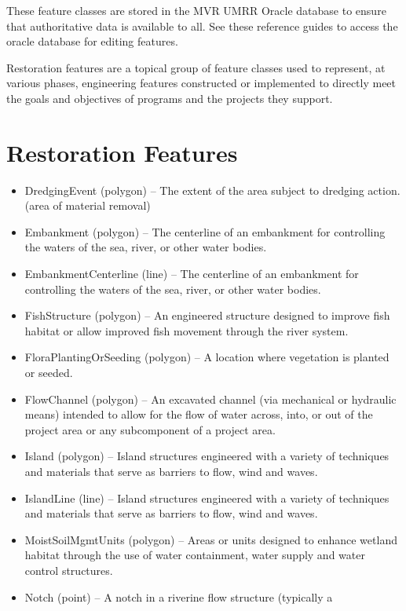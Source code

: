 \documentclass[
  letterpaper,
  DIV=11,
  numbers=noendperiod]{scrreprt}
\providecommand{\tightlist}{%
  \setlength{\itemsep}{0pt}\setlength{\parskip}{0pt}}
\begin{document}
These feature classes are stored in the MVR UMRR Oracle database to
ensure that authoritative data is available to all. See these reference
guides to access the oracle database for editing features.

Restoration features are a topical group of feature classes used to
represent, at various phases, engineering features constructed or
implemented to directly meet the goals and objectives of programs and
the projects they support.

\section{Restoration Features}\label{restoration-features-2}

\begin{itemize}
\tightlist
\item
  DredgingEvent (polygon) -- The extent of the area subject to dredging
  action. (area of material removal)
\item
  Embankment (polygon) -- The centerline of an embankment for
  controlling the waters of the sea, river, or other water bodies.
\item
  EmbankmentCenterline (line) -- The centerline of an embankment for
  controlling the waters of the sea, river, or other water bodies.
\item
  FishStructure (polygon) -- An engineered structure designed to improve
  fish habitat or allow improved fish movement through the river system.
\item
  FloraPlantingOrSeeding (polygon) -- A location where vegetation is
  planted or seeded.
\item
  FlowChannel (polygon) -- An excavated channel (via mechanical or
  hydraulic means) intended to allow for the flow of water across, into,
  or out of the project area or any subcomponent of a project area.
\item
  Island (polygon) -- Island structures engineered with a variety of
  techniques and materials that serve as barriers to flow, wind and
  waves.
\item
  IslandLine (line) -- Island structures engineered with a variety of
  techniques and materials that serve as barriers to flow, wind and
  waves.
\item
  MoistSoilMgmtUnits (polygon) -- Areas or units designed to enhance
  wetland habitat through the use of water containment, water supply and
  water control structures.
\item
  Notch (point) -- A notch in a riverine flow structure (typically a

\end{itemize}
\end{document}
